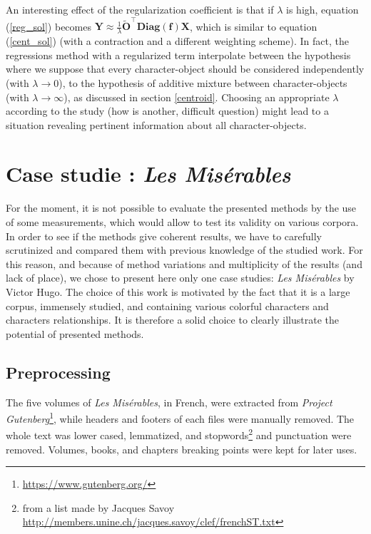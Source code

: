\documentclass[
twocolumn,
]{ceurart}
\begin{document}
An interesting effect of the regularization coefficient is that if $\lambda$ is high, equation (\ref{reg_sol}) becomes $\mathbf{Y} \approx \frac{1}{\lambda} \widetilde{\mathbf{O}}^\top \textbf{Diag}(\mathbf{f}) \mathbf{X}$, which is similar to equation (\ref{cent_sol}) (with a contraction and a different weighting scheme). In fact, the regressions method with a regularized term interpolate between the hypothesis where we suppose that every character-object should be considered independently (with $\lambda \to 0$), to the hypothesis of additive mixture between character-objects (with $\lambda \to \infty$), as discussed in section \ref{centroid}. Choosing an appropriate $\lambda$ according to the study (how is another, difficult question) might lead to a situation revealing pertinent information about all character-objects.

\section{Case studie : \emph{Les Misérables}}
\label{case_studie}

For the moment, it is not possible to evaluate the presented methods by the use of some measurements, which would allow to test its validity on various corpora. In order to see if the methods give coherent results, we have to carefully scrutinized and compared them with previous knowledge of the studied work. For this reason, and because of method variations and multiplicity of the results (and lack of place), we chose to present here only one case studies: \emph{Les Misérables} by Victor Hugo. The choice of this work is motivated by the fact that it is a large corpus, immensely studied, and containing various colorful characters and characters relationships. It is therefore a solid choice to clearly illustrate the potential of presented methods.

\subsection{Preprocessing}

The five volumes of \emph{Les Misérables}, in French, were extracted from \emph{Project Gutenberg}\footnote{\url{https://www.gutenberg.org/}}, while headers and footers of each files were manually removed. The whole text was lower cased, lemmatized, and stopwords\footnote{from a list made by Jacques Savoy \url{http://members.unine.ch/jacques.savoy/clef/frenchST.txt}} and punctuation were removed. Volumes, books, and chapters breaking points were kept for later uses. 
\end{document}
